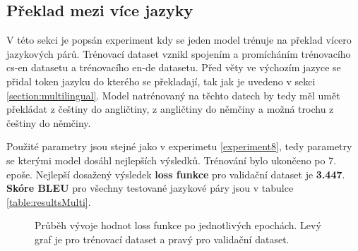 \subsection{Překlad mezi více jazyky} \label{experimentMultiLingual}
V této sekci je popsán experiment kdy se jeden model trénuje na překlad vícero jazykových párů. Trénovací dataset vznikl spojením a promícháním trénovacího cs-en datasetu a trénovacího en-de datasetu. Před věty ve výchozím jazyce se přidal token jazyku do kterého se překladají, tak jak je uvedeno v sekci \ref{section:multilingual}. Model natrénovaný na těchto datech by tedy měl umět překládat z češtiny do angličtiny, z angličtiny do němčiny a možná trochu z češtiny do němčiny.

Použité parametry jsou stejné jako v experimetu \ref{experiment8}, tedy parametry se kterými model dosáhl nejlepších výsledků. Trénování bylo ukončeno po 7. epoše. Nejlepší dosažený výsledek \textbf{loss funkce} pro validační dataset je \textbf{3.447}. \textbf{Skóre BLEU} pro všechny testované jazykové páry jsou v tabulce \ref{table:resultsMulti}.

\begin{figure}[H]
    \begin{center}
    \end{center}
	\caption{Průběh vývoje hodnot loss funkce po jednotlivých epochách. Levý graf je pro trénovací dataset a pravý pro validační dataset.}
\end{figure}

